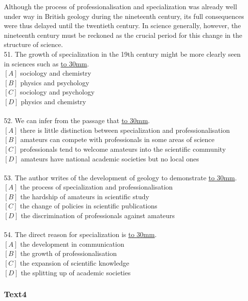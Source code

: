 \documentclass[a4paper]{article}
\begin{document}
\par
Although the process of professionalisation and specialization was already well under way in British geology during the nineteenth century, its full consequences were thus delayed until the twentieth century. In science generally, however, the nineteenth century must be reckoned as the crucial period for this change in the structure of science.
\\51.	The growth of specialization in the 19th century might be more clearly seen in sciences such as \underline{\hbox to 30mm{}}.\\$[A]$ sociology and chemistry\\$[B]$ physics and psychology\\$[C]$ sociology and psychology\\$[D]$ physics and chemistry\\\\52.	We can infer from the passage that \underline{\hbox to 30mm{}}.\\$[A]$ there is little distinction between specialization and professionalisation\\$[B]$ amateurs can compete with professionals in some areas of science\\$[C]$ professionals tend to welcome amateurs into the scientific community\\$[D]$ amateurs have national academic societies but no local ones\\\\53.	The author writes of the development of geology to demonstrate \underline{\hbox to 30mm{}}.\\$[A]$ the process of specialization and professionalisation\\$[B]$ the hardship of amateurs in scientific study\\$[C]$ the change of policies in scientific publications\\$[D]$ the discrimination of professionals against amateurs\\\\54.	The direct reason for specialization is \underline{\hbox to 30mm{}}.\\$[A]$ the development in communication\\$[B]$ the growth of professionalisation\\$[C]$ the expansion of scientific knowledge\\$[D]$ the splitting up of academic societies\\\subsubsection{Text4}
\end{document}
